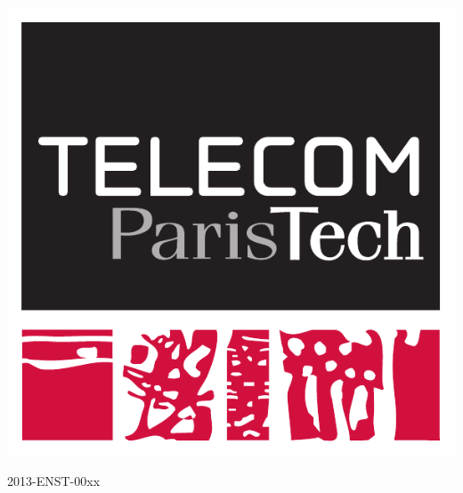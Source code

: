 


\pagestyle{empty}

\AddToShipoutPicture*{\BackgroundPicCover}

\begin{flushright}

\includegraphics[scale=0.3]{img/logos/telecom.pdf}

{\small {2013-ENST-00xx~~~~}}

\end{flushright}

